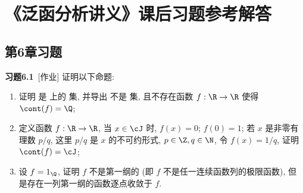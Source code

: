 \chapter{《泛函分析讲义》课后习题参考解答}
\section{第6章习题}
	
	\textbf{习题6.1}\ [作业] 证明以下命题:
	\begin{enumerate}
		\item 证明 \cJ 是 \R 上的 \Gd 集, 并导出 \Q 不是 \Gd 集, 且不存在函数 $ f:\R\to\R $ 使得 $ \cont(f)=\Q $;
		\item 定义函数 $ f:\R\to\R $, 当 $ x\in\cJ $ 时, $ f(x)=0 $; $ f(0)=1 $; 若 $ x $ 是非零有理数 $ p/q $, 这里 $ p/q $ 是 $ x $ 的不可约形式, $ p\in\Z, q\in\N $, 令 $ f(x)=1/q $, 证明 $ \cont(f)=\cJ $;
		\item 设 $ f=1_{\Q} $, 证明 $ f $ 不是第一纲的 (即 $ f $ 不是任一连续函数列的极限函数), 但是存在一列第一纲的函数逐点收敛于 $ f $.
	\end{enumerate}
